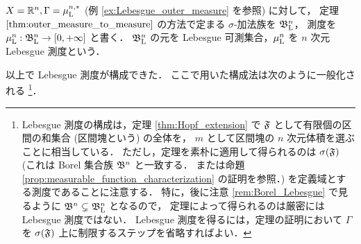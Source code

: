 \begin{example}
    $X=\mathbb{R}^n,\Gamma=\mu_{\mathrm{L}}^{n,\ast}$ (例 \ref{ex:Lebesgue_outer_measure} を参照) に対して，
    定理 $\ref{thm:outer_measure_to_measure}$ の方法で定まる $\sigma$-加法族を $\mathfrak{B}_{\mathrm{L}}^n$，
    測度を $\mu_{\mathrm{L}}^n:\mathfrak{B}_{\mathrm{L}}^n\to[0,+\infty]$ と書く．
    $\mathfrak{B}_{\mathrm{L}}^n$ の元を Lebesgue 可測集合，$\mu_{\mathrm{L}}^n$ を $n$ 次元 Lebesgue 測度という．
\end{example}

以上で Lebesgue 測度が構成できた．
ここで用いた構成法は次のように一般化される
\footnote{
    Lebesgue 測度の構成は，定理 \ref{thm:Hopf_extension} で $\mathfrak{F}$ として有限個の区間の和集合 (区間塊という) の全体を，
    $m$ として区間塊の $n$ 次元体積を選ぶことに相当している．
    ただし，定理を素朴に適用して得られるのは $\sigma(\mathfrak{F})$
    (これは Borel 集合族 $\mathfrak{B}^n$ と一致する．
    \cite[定理 6.4]{It63} または命題 \ref{prop:measurable_function_characterization} の証明を参照．)
    を定義域とする測度であることに注意する．
    特に，後に注意 \ref{rem:Borel_Lebesgue} で見るように $\mathfrak{B}^n\subsetneq\mathfrak{B}_{\mathrm{L}}^n$ となるので，
    定理によって得られるのは厳密には Lebesgue 測度ではない．
    Lebesgue 測度を得るには，定理の証明において $\Gamma$ を $\sigma(\mathfrak{F})$ 上に制限するステップを省略すればよい．
}．


